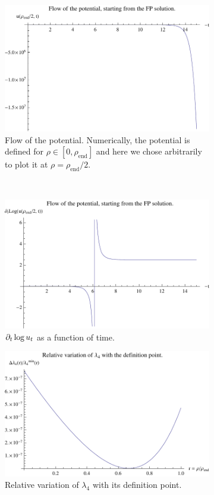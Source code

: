 \begin{figure}[htp]
\centering
\begin{subfigure}{1.\textwidth}
	\centering
	\includegraphics[width=.5\linewidth]{img/chap4/plotflowd3.pdf}
	\caption{Flow of the potential. Numerically, the potential is defined for $\rho \in [0, \rho_{\text{end}}]$ and here we chose arbitrarily to plot it at $\rho = \rho_{\text{end}}/2$.}
	\label{fig:plotflow}
	\end{subfigure}\\
\centering
\begin{subfigure}{.5\textwidth}
	\centering
	\includegraphics[width=.9\linewidth]{img/chap4/plotlogflowd3.pdf}
	\caption{$\partial_{t} \log{u_t}$ as a function of time.}
	\label{fig:plotlogflow}
	\end{subfigure}%
\begin{subfigure}{.5\textwidth}
	\centering
	\includegraphics[width=.9\linewidth]{img/chap4/plotnud3.pdf}
	\caption{Relative variation of $\lambda_4$ with its definition point.}
	\label{fig:plotnu}
\end{subfigure}
\caption{}
\label{fig:flow}
\end{figure}

